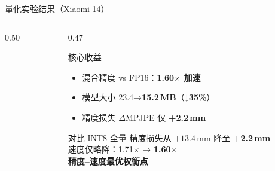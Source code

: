 \documentclass{beamer}
\begin{document}
\begin{frame}[shrink=5]{量化实验结果（Xiaomi 14）}
\begin{columns}[T]
\begin{column}{0.50\textwidth}
        \end{column}
        \begin{column}{0.47\textwidth}
            \begin{exampleblock}{\small 核心收益}
                \footnotesize
                \begin{itemize}
                    \item 混合精度 vs FP16：\textbf{1.60$\times$ 加速}
                    \item 模型大小 23.4→\textbf{15.2\,MB}（↓\textbf{35\%}）
                    \item 精度损失 $\Delta$MPJPE 仅 \textbf{+2.2\,mm}
                \end{itemize}
            \end{exampleblock}
            \vspace{4pt}
            \begin{alertblock}{\small 对比 INT8 全量}
                \footnotesize
                精度损失从 $+13.4$\,mm 降至 \textbf{+2.2\,mm}\\
                速度仅略降：1.71$\times$ → \textbf{1.60$\times$}\\
                \textbf{精度–速度最优权衡点}
            \end{alertblock}
        \end{column}
    \end{columns}
\end{frame}
\end{document}
